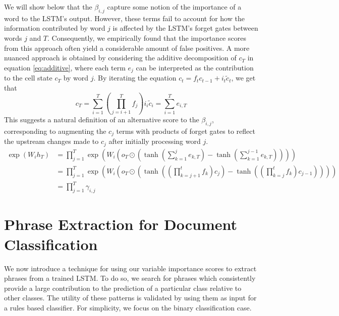 \documentclass{article}
\begin{document}
We will show below that the $\beta_{i,j}$  capture some notion of the importance of a word to the LSTM's output.   However, these terms fail to account for how the information contributed by word $j$ is affected by the LSTM's forget gates between words $j$ and $T$. Consequently, we empirically found that the importance scores from this approach often yield a considerable amount of false positives. A more nuanced approach is obtained by considering the additive decomposition of $c_T$ in equation \eqref{eq:additive}, where each term $e_j$ can be interpreted as the contribution to the cell state $c_T$ by word $j$. By iterating the equation $c_t = f_tc_{t - 1} + i_t \tilde{c}_t$, we get that
\begin{equation}
c_T = \sum_{i=1}^T (\prod_{j=i + 1}^T f_j) i_i \tilde{c}_i = \sum_{i=1}^T e_{i, T} \label{eq:additive}
\end{equation}
This suggests a natural definition of an alternative score to the $\beta_{i, j}$, corresponding to augmenting the $c_j$ terms with products of forget gates to reflect the upstream changes made to $c_j$ after initially processing word $j$. 
\begin{align}
\label{eq:gamma}
\exp(W_i h_T) & = \prod_{j=1}^T \exp \left( W_i(o_T \odot (\tanh(\sum_{k = 1}^j e_{k, T}) - \tanh(\sum_{k=1}^{j - 1}e_{k, T})))\right) \\
& = \prod_{j=1}^T \exp \left( W_i(o_T \odot (\tanh((\prod_{k=j+1}^t f_k) c_j) - \tanh((\prod_{k=j}^t f_k) c_{j - 1}))) \right) \\
& = \prod_{j=1}^T \gamma_{i,j}
\end{align}
\section{Phrase Extraction for Document Classification}
We now introduce a technique for using our variable importance scores to extract phrases from a trained LSTM. To do so, we search for phrases which consistently provide a large contribution to the prediction of a particular class relative to other classes. The utility of these patterns is validated by using them as input for a rules based classifier. For simplicity, we focus on the binary classification case.
\end{document}
